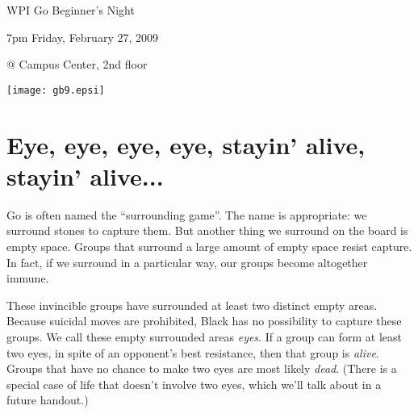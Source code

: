 \documentclass{article}
\begin{document}
\centerline{\Huge WPI Go Beginner's Night}
\centerline{\Huge 7pm Friday, February 27, 2009}
\centerline{\Huge @ Campus Center, 2nd floor}
\vfill

\begin{center}
\texttt{[image: gb9.epsi]}
\end{center}

\vfill

\newpage

\section*{Eye, eye, eye, eye, stayin' alive, stayin' alive...}

Go is often named the ``surrounding game''.  The name is appropriate: we
surround stones to capture them.  But another thing we surround on the
board is empty space.  Groups that surround a large amount of empty
space resist capture.  In fact, if we surround in a particular way,
our groups become altogether immune.
\begin{center}
\hspace{.2in}
\hspace{.2in}
%
%
\hspace{.2in}
\end{center}
These invincible groups have surrounded at least two distinct empty
areas.  Because suicidal moves are prohibited, Black has no
possibility to capture these groups.  We call these empty surrounded
areas \emph{eyes}.  If a group can form at least two eyes, in spite of
an opponent's best resistance, then that group is \emph{alive}.
Groups that have no chance to make two eyes are most likely
\emph{dead}.  (There is a special case of life that doesn't involve
two eyes, which we'll talk about in a future handout.)
\end{document}
